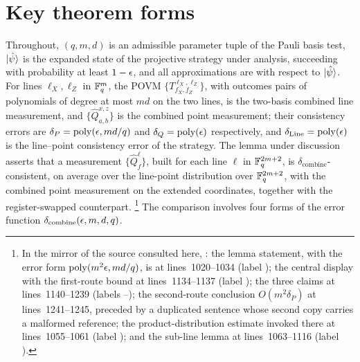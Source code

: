 \documentclass[11pt]{article}
\DeclareMathOperator{\poly}{poly}
\begin{document}
\section{Key theorem forms}

Throughout, $(q,m,d)$ is an admissible parameter tuple of the Pauli basis
test, $\ket{\hat\psi}$ is the expanded state of the projective strategy
under analysis, succeeding with probability at least $1-\epsilon$, and all
approximations are with respect to $\ket{\hat\psi}$.  For lines
$\ell_X, \ell_Z$ in $\mathbb{F}_q^m$, the POVM $\{T^{\ell_X,\ell_Z}_{f_X,f_Z}\}$,
with outcomes pairs of polynomials of degree at most $md$ on the two
lines, is the two-basis combined line measurement, and
$\{\hat Q^{x,z}_{a,b}\}$ is the combined point measurement; their
consistency errors are $\delta_P = \poly(\eps, md/q)$ and
$\delta_Q = \poly(\eps)$ respectively, and
$\delta_{\mathrm{Line}} = \poly(\eps)$ is the line--point consistency
error of the strategy.  The lemma under discussion asserts that a
measurement $\{\hat Q^{\ell}_f\}$, built for each line $\ell$ in
$\mathbb{F}_q^{2m+2}$, is $\delta_{\mathrm{combine}}$-consistent, on average over
the line-point distribution over $\mathbb{F}_q^{2m+2}$, with the combined point
measurement on the extended coordinates, together with the
register-swapped counterpart.%
\footnote{In the mirror of the source consulted here,
: the
lemma statement, with the error form $\poly(m^2\eps, md/q)$, is at
lines~1020--1034 (label ); the central display with
the first-route bound at lines~1134--1137
(label ); the three claims at
lines~1140--1239 (labels --); the
second-route conclusion $O(m^2\delta_P)$ at lines~1241--1245, preceded by
a duplicated sentence whose second copy carries a malformed reference;
the product-distribution estimate invoked there at lines~1055--1061
(label ); and the sub-line lemma at
lines~1063--1116 (label ).}
The comparison involves four forms of the error function
$\delta_{\mathrm{combine}}(\epsilon,m,d,q)$.
\end{document}
